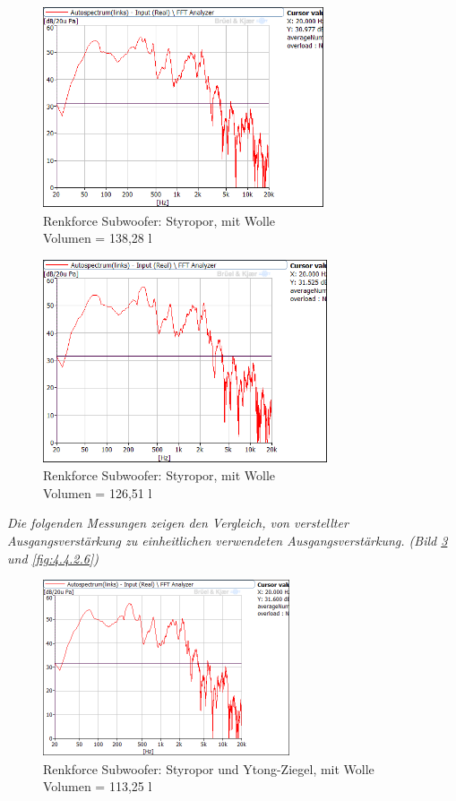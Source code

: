 \begin{figure} [H]
\centering
\includegraphics[width=0.74\textwidth]{img/Optimierung/Sub/RenkforceStyro_138l_Wolle.png}
\caption{Renkforce Subwoofer: Styropor, mit Wolle \\Volumen = 138,28 l}
\label{fig:4.4.2.3}
\end{figure}

\begin{figure} [H]
\centering
\includegraphics[width=0.75\textwidth]{img/Optimierung/Sub/RenkforceStyro_126l_Wolle.png}
\caption{Renkforce Subwoofer: Styropor, mit Wolle \\Volumen = 126,51 l}
\label{fig:4.4.2.4}
\end{figure}

\newpage
\textit{Die folgenden Messungen zeigen den Vergleich, von verstellter Ausgangsverstärkung zu einheitlichen verwendeten Ausgangsverstärkung. (Bild \ref{fig:4.4.2.5} und \ref{fig:4.4.2.6})}
\begin{figure} [H]
\centering
\includegraphics[width=0.65\textwidth]{img/Optimierung/Sub/RenkforceStyro_113l_Wolle.png}
\caption{Renkforce Subwoofer: Styropor und Ytong-Ziegel, mit Wolle \\Volumen = 113,25 l}
\label{fig:4.4.2.5}
\end{figure}

